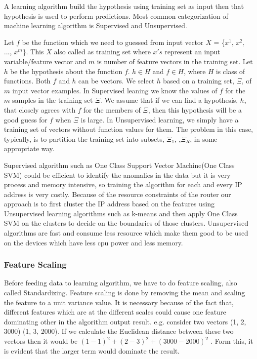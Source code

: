 \documentclass[10pt,oneside,a4paper]{article}
\begin{document}
A learning algorithm build the hypothesis using training set as input then that hypothesis is used to perform predictions. Most common categorization of machine learning algorithm is Supervised and Unsupervised.

Let $f$ be the function which we need to guessed from input vector $X$ = \{$x^{1}$, $x^{2}$, ..., $x^{m}$\}. This $X$ also called as training set where $x's$ represent an input variable/feature vector and $m$ is number of feature vectors in the training set. Let $h$ be the hypothesis about the function $f$. $h \in H$ and $f \in H$, where $H$ is class of functions. Both $f$ and $h$ can be vectors. We select $h$ based on a training set, $\Xi$, of $m$ input vector examples. In Supervised leaning we know the values of $f$ for the $m$ samples in the training set $\Xi$. We assume that if we can find a hypothesis, $h$, that closely agrees with $f$ for the members of $\Xi$, then this hypothesis will be a good guess for $f$ when $\Xi$ is large. In Unsupervised learning, we simply have a training set of vectors without function values for them. The problem in this case, typically, is to partition the training set into subsets, $\Xi_1$,  ,$\Xi_R$, in some appropriate way.\cite{machineLearning}

Supervised algorithm such as One Class Support Vector Machine(One Class SVM)\cite{SVM} could be efficient to identify the anomalies in the data but it is very process and memory intensive, so training the algorithm for each and every IP address is very costly. Because of the resource constraints of the router our approach is to first cluster the IP address based on the features using Unsupervised learning algorithms such as k-means and then apply One Class SVM on the clusters to decide on the boundaries of those clusters. Unsupervised algorithms are fast and consume less resource which make them good to be used on the devices which have less cpu power and less memory.

\subsubsection{Feature Scaling}

Before feeding data to learning algorithm, we have to do feature scaling, also called Standardizing. Feature scaling is done by removing the mean and scaling the feature to a unit variance value. It is necessary because of the fact that, different features which are at the different scales could cause one feature dominating other in the algorithm output result. e.g. consider two vectors (1, 2, 3000) (1, 3, 2000). If we calculate the Euclidean distance between these two vectors then it would be $(1-1)^2 + (2-3)^2 + (3000-2000)^2$ . Form this, it is evident that the larger term would dominate the result.
\end{document}
